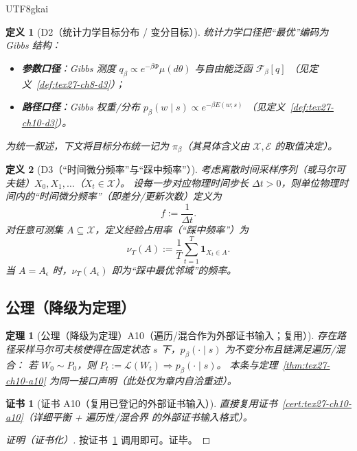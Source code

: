 \documentclass[12pt]{article}
\newtheorem{definition}{定义}[section]
\newtheorem{theorem}{定理}[section]
\newtheorem{Certificate}{证书}[section]
\newcommand{\indicator}[1]{\mathbf{1}_{#1}}
\begin{document}
\begin{CJK*}{UTF8}{gkai}
\begin{definition}[D2（统计力学目标分布 / 变分目标）]
\label{def:tex27-ch20-d2}
统计力学口径把“最优”编码为 Gibbs 结构：
\begin{itemize}
  \item \textbf{参数口径}：Gibbs 测度 $q_\beta\propto e^{-\beta\Phi}\mu(d\theta)$ 与自由能泛函 $\mathcal{F}_\beta[q]$
  （见定义~\ref{def:tex27-ch8-d3}）；
  \item \textbf{路径口径}：Gibbs 权重/分布 $p_\beta(w\mid s)\propto e^{-\beta E(w;s)}$
  （见定义~\ref{def:tex27-ch10-d3}）。
\end{itemize}
为统一叙述，下文将目标分布统一记为 $\pi_\beta$（其具体含义由 $\mathcal{X},\mathcal{E}$ 的取值决定）。
\end{definition}

\begin{definition}[D3（“时间微分频率”与“踩中频率”）]
\label{def:tex27-ch20-d3}
考虑离散时间采样序列（或马尔可夫链）$X_0,X_1,\dots$（$X_t\in\mathcal{X}$）。
设每一步对应物理时间步长 $\Delta t>0$，则单位物理时间内的“时间微分频率”（即差分/更新次数）定义为
\[
  f:=\frac{1}{\Delta t}.
\]
对任意可测集 $A\subseteq\mathcal{X}$，定义经验占用率（“踩中频率”）为
\[
  \nu_T(A):=\frac{1}{T}\sum_{t=1}^{T}\indicator{X_t\in A}.
\]
当 $A=A_\epsilon$ 时，$\nu_T(A_\epsilon)$ 即为“踩中最优邻域”的频率。
\end{definition}

\subsection{公理（降级为定理）}
\label{subsec:tex27-ch20-axioms}

\begin{theorem}[公理（降级为定理）A10（遍历/混合作为外部证书输入；复用）]
\label{thm:tex27-ch20-a10}
存在路径采样马尔可夫核使得在固定状态 $s$ 下，$p_\beta(\cdot\mid s)$ 为不变分布且链满足遍历/混合：
若 $W_0\sim P_0$，则 $P_t:=\mathcal{L}(W_t)\Rightarrow p_\beta(\cdot\mid s)$。
本条与定理~\ref{thm:tex27-ch10-a10} 为同一接口声明（此处仅为章内自洽重述）。
\end{theorem}

\begin{Certificate}[证书 A10（复用已登记的外部证书输入）]
\label{cert:tex27-ch20-a10}
直接复用证书~\ref{cert:tex27-ch10-a10}（详细平衡 + 遍历性/混合界 的外部证书输入格式）。
\end{Certificate}

\begin{proof}[证明（证书化）]
按证书~\ref{cert:tex27-ch20-a10} 调用即可。证毕。
\end{proof}


\end{CJK*}
\end{document}
